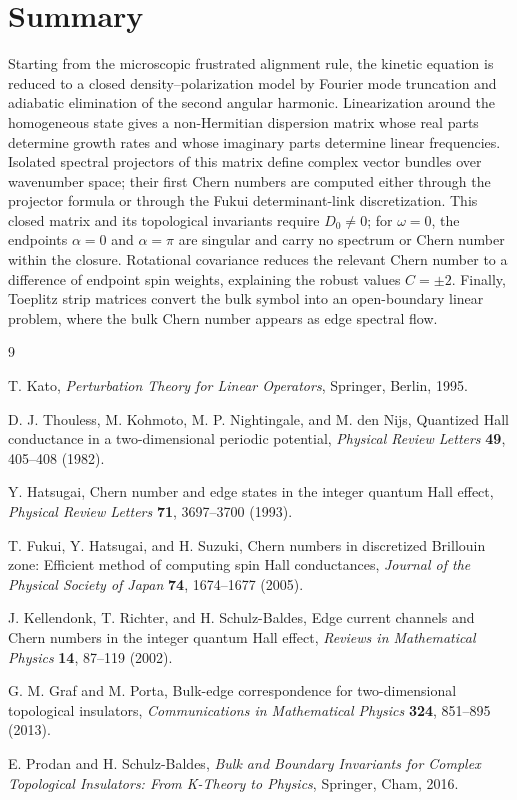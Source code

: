 \documentclass[11pt]{article}
\numberwithin{equation}{section}
\begin{document}
\section{Summary}

Starting from the microscopic frustrated alignment rule, the kinetic
equation is reduced to a closed density--polarization model by Fourier
mode truncation and adiabatic elimination of the second angular harmonic.
Linearization around the homogeneous state gives a non-Hermitian
dispersion matrix whose real parts determine growth rates and whose
imaginary parts determine linear frequencies. Isolated spectral
projectors of this matrix define complex vector bundles over wavenumber
space; their first Chern numbers are computed either through the
projector formula or through the Fukui determinant-link discretization.
This closed matrix and its topological invariants require $D_0\ne0$; for
$\omega=0$, the endpoints $\alpha=0$ and $\alpha=\pi$ are singular and
carry no spectrum or Chern number within the closure.
Rotational covariance reduces the relevant Chern number to a difference
of endpoint spin weights, explaining the robust values $C=\pm2$. Finally,
Toeplitz strip matrices convert the bulk symbol into an open-boundary
linear problem, where the bulk Chern number appears as edge spectral flow.

\begin{thebibliography}{9}

T. Kato,
\textit{Perturbation Theory for Linear Operators},
Springer, Berlin, 1995.

D. J. Thouless, M. Kohmoto, M. P. Nightingale, and M. den Nijs,
Quantized Hall conductance in a two-dimensional periodic potential,
\textit{Physical Review Letters} \textbf{49}, 405--408 (1982).

Y. Hatsugai,
Chern number and edge states in the integer quantum Hall effect,
\textit{Physical Review Letters} \textbf{71}, 3697--3700 (1993).

T. Fukui, Y. Hatsugai, and H. Suzuki,
Chern numbers in discretized Brillouin zone: Efficient method of
computing spin Hall conductances,
\textit{Journal of the Physical Society of Japan} \textbf{74}, 1674--1677
(2005).

J. Kellendonk, T. Richter, and H. Schulz-Baldes,
Edge current channels and Chern numbers in the integer quantum Hall
effect,
\textit{Reviews in Mathematical Physics} \textbf{14}, 87--119 (2002).

G. M. Graf and M. Porta,
Bulk-edge correspondence for two-dimensional topological insulators,
\textit{Communications in Mathematical Physics} \textbf{324}, 851--895
(2013).

E. Prodan and H. Schulz-Baldes,
\textit{Bulk and Boundary Invariants for Complex Topological Insulators:
From K-Theory to Physics},
Springer, Cham, 2016.

\end{thebibliography}
\end{document}
